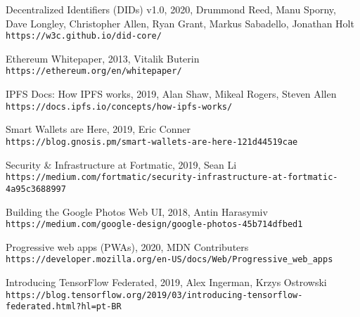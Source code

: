 \begin{thebibliography}{9}
    Decentralized Identifiers (DIDs) v1.0, 2020,
    Drummond Reed, Manu Sporny, Dave Longley, Christopher Allen,
    Ryan Grant, Markus Sabadello, Jonathan Holt
    \\\texttt{https://w3c.github.io/did-core/}

    Ethereum Whitepaper, 2013, Vitalik Buterin
    \\\texttt{https://ethereum.org/en/whitepaper/}
    
    IPFS Docs: How IPFS works, 2019, Alan Shaw, Mikeal Rogers, Steven Allen
    \\\texttt{https://docs.ipfs.io/concepts/how-ipfs-works/}

    Smart Wallets are Here, 2019, Eric Conner
    \\\texttt{https://blog.gnosis.pm/smart-wallets-are-here-121d44519cae}

    Security & Infrastructure at Fortmatic, 2019, Sean Li
    \\\texttt{https://medium.com/fortmatic/security-infrastructure-at-fortmatic-4a95c3688997}

    Building the Google Photos Web UI, 2018, Antin Harasymiv
    \\\texttt{https://medium.com/google-design/google-photos-45b714dfbed1}

    Progressive web apps (PWAs), 2020, MDN Contributers
    \\\texttt{https://developer.mozilla.org/en-US/docs/Web/Progressive\_web\_apps}

    Introducing TensorFlow Federated, 2019, Alex Ingerman, Krzys Ostrowski
    \\\texttt{https://blog.tensorflow.org/2019/03/introducing-tensorflow-federated.html?hl=pt-BR}
\end{thebibliography}